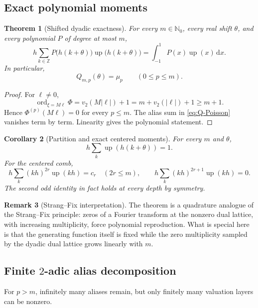 \documentclass[11pt]{article}
\newtheorem{theorem}{Theorem}[section]
\newtheorem{corollary}[theorem]{Corollary}
\theoremstyle{definition}
\newtheorem{remark}[theorem]{Remark}
\DeclareMathOperator{\ord}{ord}
\newcommand{\Up}{\operatorname{up}}
\newcommand{\dd}{\,\mathrm{d}}
\newcommand{\Z}{\mathbb{Z}}
\newcommand{\N}{\mathbb{N}}
\begin{document}
\subsection{Exact polynomial moments}

\begin{theorem}[Shifted dyadic exactness]
\label{thm:shifted-exactness}
For every $m\in\N_0$, every real shift $\theta$, and every polynomial $P$ of
degree at most $m$,
\begin{equation}
 h\sum_{k\in\Z}P\bigl(h(k+\theta)\bigr)
 \Up\bigl(h(k+\theta)\bigr)
 =\int_{-1}^{1}P(x)\Up(x)\dd x.
 \label{eq:polynomial-exactness}
\end{equation}
In particular,
\begin{equation}
 Q_{m,p}(\theta)=\mu_p
 \qquad(0\le p\le m).
 \label{eq:monomial-exactness}
\end{equation}
\end{theorem}

\begin{proof}
For $\ell\ne0$,
\[
 \ord_{\xi=M\ell}\Phi
 =v_2(M|\ell|)+1=m+v_2(|\ell|)+1\ge m+1.
\]
Hence $\Phi^{(p)}(M\ell)=0$ for every $p\le m$.  The alias sum in
\eqref{eq:Q-Poisson} vanishes term by term.  Linearity gives the polynomial
statement.
\end{proof}

\begin{corollary}[Partition and exact centered moments]
For every $m$ and $\theta$,
\[
 h\sum_k\Up(h(k+\theta))=1.
\]
For the centered comb,
\[
 h\sum_k(kh)^{2r}\Up(kh)=c_r\quad(2r\le m),
 \qquad
 h\sum_k(kh)^{2r+1}\Up(kh)=0.
\]
The second odd identity in fact holds at every depth by symmetry.
\end{corollary}

\begin{remark}[Strang--Fix interpretation]
The theorem is a quadrature analogue of the Strang--Fix principle: zeros of a
Fourier transform at the nonzero dual lattice, with increasing multiplicity,
force polynomial reproduction.  What is special here is that the generating
function itself is fixed while the zero multiplicity sampled by the dyadic
dual lattice grows linearly with $m$.
\end{remark}

\subsection{Finite \texorpdfstring{$2$}{2}-adic alias decomposition}

For $p>m$, infinitely many aliases remain, but only finitely many valuation
layers can be nonzero.
\end{document}
